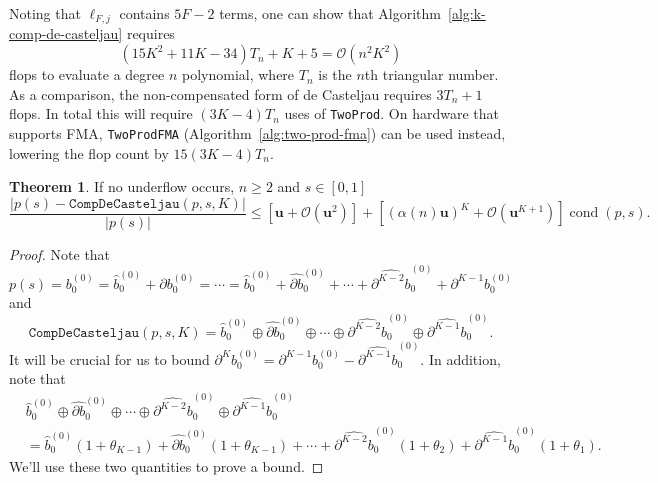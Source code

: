 \documentclass[letterpaper,10pt]{article}
\theoremstyle{definition}
\newtheorem{theorem}{Theorem}
\newcommand{\cond}[1]{\operatorname{cond}\left(#1\right)}
\newcommand{\mach}{\mathbf{u}}
\begin{document}
Noting that \(\ell_{F, j}\) contains \(5F - 2\) terms, one can
show that Algorithm~\ref{alg:k-comp-de-casteljau} requires
\begin{equation}
(15K^2 + 11K - 34)T_n + K + 5 =
\mathcal{O}\left(n^2 K^2\right)
\end{equation}
flops to evaluate a degree \(n\) polynomial, where \(T_n\) is the
\(n\)th triangular number. As a comparison, the non-compensated form of
de Casteljau requires \(3 T_n + 1\) flops. In total this will require
\((3K - 4)T_n\) uses of \texttt{TwoProd}. On hardware that supports
FMA, \texttt{TwoProdFMA} (Algorithm~\ref{alg:two-prod-fma}) can be used
instead, lowering the flop count by \(15(3K - 4)T_n\).

\begin{theorem}
  If no underflow occurs, \(n \geq 2\) and \(s \in \left[0, 1\right]\)
  \begin{equation}
    \frac{\left|p(s) - \mathtt{CompDeCasteljau}(p, s, K)\right|}{
      \left|p(s)\right|} \leq \left[\mach + \mathcal{O}\left(\mach^2\right)
      \right] +
      \left[\left(\alpha(n) \mach\right)^K + \mathcal{O}\left(
      \mach^{K + 1}\right)\right] \cond{p, s}.
  \end{equation}
\end{theorem}

\begin{proof}
Note that
\begin{equation}
p(s) = b_0^{(0)} = \widehat{b}_0^{(0)} + \partial b_0^{(0)}
= \cdots
= \widehat{b}_0^{(0)} + \widehat{\partial b}_0^{(0)} + \cdots
+ \widehat{\partial^{K - 2} b}_0^{(0)} + \partial^{K - 1} b_0^{(0)}
\end{equation}
and
\begin{equation}
\mathtt{CompDeCasteljau}(p, s, K) = \widehat{b}_0^{(0)} \oplus
\widehat{\partial b}_0^{(0)} \oplus \cdots
\oplus \widehat{\partial^{K - 2} b}_0^{(0)} \oplus
\widehat{\partial^{K - 1} b}_0^{(0)}.
\end{equation}
It will be crucial for us to bound
\(\partial^K b_0^{(0)} = \partial^{K - 1} b_0^{(0)} -
\widehat{\partial^{K - 1} b}_0^{(0)}\). In addition, note that
\begin{align}
&\widehat{b}_0^{(0)} \oplus
\widehat{\partial b}_0^{(0)} \oplus \cdots
\oplus \widehat{\partial^{K - 2} b}_0^{(0)} \oplus
\widehat{\partial^{K - 1} b}_0^{(0)} \\
&= \widehat{b}_0^{(0)} \left(1 + \theta_{K - 1}\right) +
\widehat{\partial b}_0^{(0)} \left(1 + \theta_{K - 1}\right) + \cdots
+ \widehat{\partial^{K - 2} b}_0^{(0)} \left(1 + \theta_2\right) +
\widehat{\partial^{K - 1} b}_0^{(0)} \left(1 + \theta_1\right).
\end{align}
We'll use these two quantities to prove a bound.
\end{proof}
\end{document}
